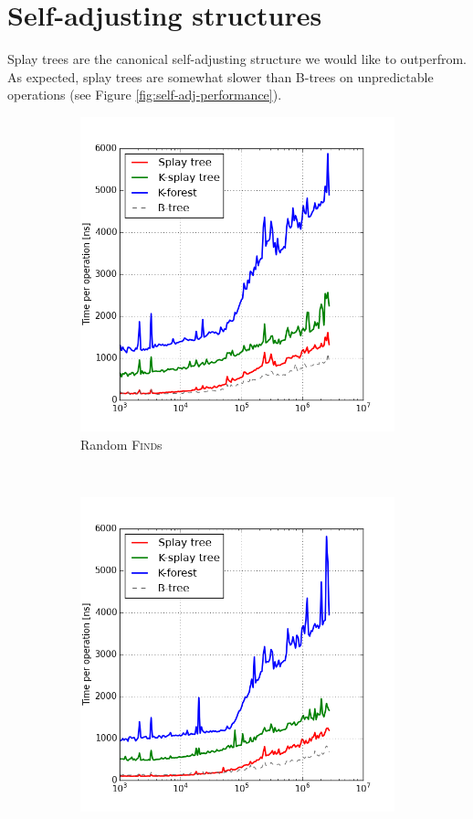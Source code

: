 \section{Self-adjusting structures}
Splay trees are the canonical self-adjusting structure we would like to
outperfrom. As expected, splay trees are somewhat slower than B-trees on
unpredictable operations (see Figure \ref{fig:self-adj-performance}).

\begin{figure}
\begin{subfigure}[b]{0.45\textwidth}
	\includegraphics[width=\textwidth]{img/performance/self-adj-random-find}
	\caption{Random \textsc{Find}s}
\end{subfigure}
~
\begin{subfigure}[b]{0.45\textwidth}
	\includegraphics[width=\textwidth]{img/performance/self-adj-random-insert}

\end{subfigure}
\end{figure}
